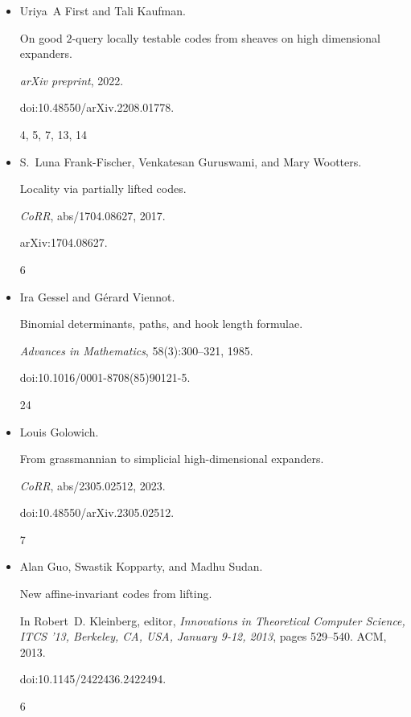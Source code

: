 \begin{itemize}
\item[] 
[10]

Uriya A First and Tali Kaufman.


On good $2$-query locally testable codes from sheaves on high
dimensional expanders.


\emph{arXiv preprint}, 2022.


doi:10.48550/arXiv.2208.01778.


4, 5, 7, 13, 14




\item[] 
[11]

S. Luna Frank-Fischer, Venkatesan Guruswami, and Mary Wootters.


Locality via partially lifted codes.


\emph{CoRR}, abs/1704.08627, 2017.


arXiv:1704.08627.


6




\item[] 
[12]

Ira Gessel and Gérard Viennot.


Binomial determinants, paths, and hook length formulae.


\emph{Advances in Mathematics}, 58(3):300–321, 1985.


doi:10.1016/0001-8708(85)90121-5.


24




\item[] 
[13]

Louis Golowich.


From grassmannian to simplicial high-dimensional expanders.


\emph{CoRR}, abs/2305.02512, 2023.


doi:10.48550/arXiv.2305.02512.


7




\item[] 
[14]

Alan Guo, Swastik Kopparty, and Madhu Sudan.


New affine-invariant codes from lifting.


In Robert D. Kleinberg, editor, \emph{Innovations in Theoretical
Computer Science, ITCS ’13, Berkeley, CA, USA, January 9-12, 2013}, pages
529–540. ACM, 2013.


doi:10.1145/2422436.2422494.


6





\end{itemize}
